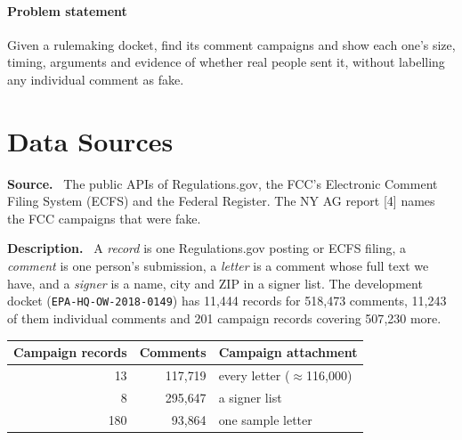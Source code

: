 \documentclass[10pt,twocolumn]{article}
\newcommand{\lead}[1]{\textbf{#1.}\ }
\begin{document}
\paragraph{Problem statement} Given a rulemaking docket, find its comment campaigns and show each
one's size, timing, arguments and evidence of whether real people sent it, without labelling any
individual comment as fake.

\section{Data Sources}

\begin{leads}
  \item \lead{Source} The public APIs of Regulations.gov, the FCC's Electronic Comment Filing
        System (ECFS) and the Federal Register. The NY AG report [4] names the FCC campaigns that
        were fake.
  \item \lead{Description} A \emph{record} is one Regulations.gov posting or ECFS filing, a
        \emph{comment} is one person's submission, a \emph{letter} is a comment whose full text we
        have, and a \emph{signer} is a name, city and ZIP in a signer list. The development docket
        (\texttt{EPA-HQ-OW-2018-0149}) has 11{,}444 records for 518{,}473 comments, 11{,}243 of them \mbox{individual} comments and 201 campaign records covering 507{,}230 more.

        \par\smallskip
        {\small
        \begin{tabular*}{\linewidth}{@{\extracolsep{\fill}}rrl@{}}
        \toprule
        \multicolumn{1}{r}{\sffamily\bfseries\footnotesize Campaign records} & \multicolumn{1}{r}{\sffamily\bfseries\footnotesize Comments} & {\sffamily\bfseries\footnotesize Campaign attachment} \\
        \midrule
        13 & 117{,}719 & every letter ($\approx$116{,}000) \\
        8 & 295{,}647 & a signer list \\
        180 & 93{,}864 & one sample letter \\
        \bottomrule
        \end{tabular*}}
        \smallskip


\end{leads}
\end{document}
